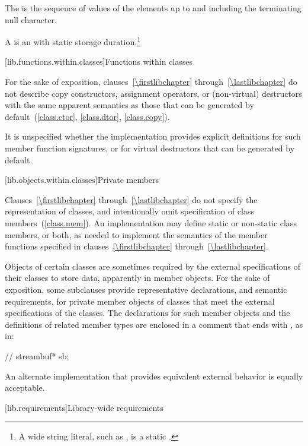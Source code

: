 \pnum
The
is the sequence of values of the
elements up to and including the terminating null character.
%

\pnum
A
%
%
is an \ntwcs with
static storage duration.\footnote{A wide string literal, such as ,
is a static \ntwcs.}

[lib.functions.within.classes]{Functions within classes}

\pnum
For the sake of exposition, clauses~\ref{\firstlibchapter} through~\ref{\lastlibchapter}
do not describe copy constructors, assignment
operators, or (non-virtual) destructors with the same apparent
semantics as those that can be generated by default~(\ref{class.ctor}, \ref{class.dtor}, \ref{class.copy}).

\pnum
{}%
%
%
It is unspecified whether
the implementation provides explicit definitions for such member function
signatures, or for virtual destructors that can be generated by default.

[lib.objects.within.classes]{Private members}

\pnum
Clauses~\ref{\firstlibchapter} through~\ref{\lastlibchapter}
do not specify the representation of classes, and intentionally
omit specification of class members~(\ref{class.mem}). An implementation may
define static or non-static class members, or both, as needed to implement the
semantics of the member functions specified in clauses~\ref{\firstlibchapter}
through~\ref{\lastlibchapter}.

\pnum
Objects of certain classes are sometimes required by the external specifications of
their classes to store data, apparently in member objects. For the sake of exposition,
some subclauses provide representative declarations, and semantic requirements, for
private member objects of classes that meet the external specifications of the classes.
The declarations for such member objects and the definitions of related member types are
enclosed in a comment that ends with \expos, as in:

\begin{codeblock}
//	streambuf* sb;  \expos
\end{codeblock}

\pnum
An alternate implementation that provides equivalent external behavior is equally acceptable.

[lib.requirements]{Library-wide requirements}

